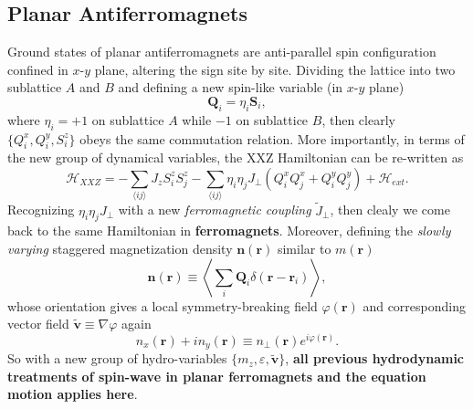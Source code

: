 \documentclass[10pt,nofootinbib,letterpaper]{revtex4}
\begin{document}
	\subsection{Planar Antiferromagnets}
		Ground states of planar antiferromagnets are anti-parallel spin configuration confined in $x$-$y$ plane, altering the sign site by site. Dividing the lattice into two sublattice $A$ and $B$ and defining a new spin-like variable (in $x$-$y$ plane)
		\begin{equation*}
			\bm{Q}_i=\eta_{i}\bm{S}_i,
		\end{equation*}
		where $\eta_i=+1$ on sublattice $A$ while $-1$ on sublattice $B$, then clearly $\{Q_i^x,Q_i^y,S_i^z\}$ obeys the same commutation relation. More importantly, in terms of the new group of dynamical variables, the XXZ Hamiltonian can be re-written as
		\begin{equation}\label{2.4.1}
			\mathcal{H}_{XXZ}=-\sum_{\langle ij\rangle}J_z S_i^z S_j^z-\sum_{\langle ij\rangle}\eta_i\eta_j J_\perp(Q_i^x Q_j^x+Q_i^y Q_j^y)+\mathcal{H}_{ext}.
		\end{equation}
		Recognizing $\eta_i\eta_j J_\perp$ with a new \emph{ferromagnetic coupling} $\widetilde{J}_\perp$, then clealy we come back to the same Hamiltonian in \textbf{ferromagnets}. Moreover, defining the \emph{slowly varying} staggered magnetization density $\bm{n}(\bm{r})$ similar to $m(\bm{r})$
		\begin{equation}\label{2.4.2}
			\bm{n}(\bm{r})\equiv\left\langle\sum_i\bm{Q}_i\delta(\bm{r}-\bm{r}_i)\right\rangle,
		\end{equation}
		whose orientation gives a local symmetry-breaking field $\varphi(\bm{r})$  and corresponding vector field $\widetilde{\bm{v}}\equiv\nabla\varphi$ again
		\begin{equation}\label{2.4.3}
			n_x(\bm{r})+in_y(\bm{r})\equiv n_\perp(\bm{r})e^{i\varphi(\bm{r})}.
		\end{equation}
		So with a new group of hydro-variables $\{m_z,\varepsilon,\widetilde{\bm{v}}\}$, \textbf{\color{red}all previous hydrodynamic treatments of spin-wave in planar ferromagnets and the equation motion applies here}.
\end{document}
